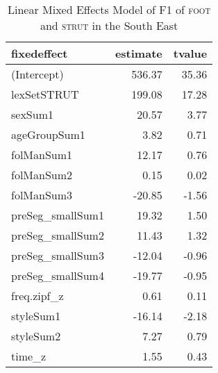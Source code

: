 \begin{table}[ht]
\centering
\begin{tabular}{lrr}
  \hline
fixedeffect & estimate & tvalue \\ 
  \hline
(Intercept) & 536.37 & 35.36 \\ 
  lexSetSTRUT & 199.08 & 17.28 \\ 
  sexSum1 & 20.57 & 3.77 \\ 
  ageGroupSum1 & 3.82 & 0.71 \\ 
  folManSum1 & 12.17 & 0.76 \\ 
  folManSum2 & 0.15 & 0.02 \\ 
  folManSum3 & -20.85 & -1.56 \\ 
  preSeg\_smallSum1 & 19.32 & 1.50 \\ 
  preSeg\_smallSum2 & 11.43 & 1.32 \\ 
  preSeg\_smallSum3 & -12.04 & -0.96 \\ 
  preSeg\_smallSum4 & -19.77 & -0.95 \\ 
  freq.zipf\_z & 0.61 & 0.11 \\ 
  styleSum1 & -16.14 & -2.18 \\ 
  styleSum2 & 7.27 & 0.79 \\ 
  time\_z & 1.55 & 0.43 \\ 
   \hline
\end{tabular}
\caption{Linear Mixed Effects Model of F1 of \textsc{foot} and \textsc{strut} in the South East \label{tbl:FSF1SE}} 
\end{table}
